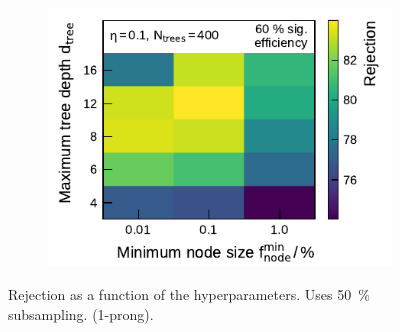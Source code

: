 \begin{figure}[ht]
\begin{subfigure}[t]{0.48\textwidth}
  \end{subfigure}\hfill
  \begin{subfigure}[t]{0.48\textwidth}
    \centering
    \includegraphics{./figures/bdt_perf/gridsearch_1p/scan_MinNodeSize_MaxDepth.pdf}
  \end{subfigure}
  \caption{Rejection as a function of the hyperparameters. Uses
    \SI{50}{\percent} subsampling. (1-prong). }
  \label{fig:hyperparameter_scan_1p}
\end{figure}

